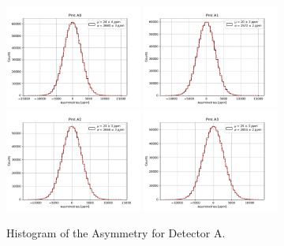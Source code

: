 \begin{figure}[!h]
\centering
\includegraphics[width = 0.40\textwidth]{Analysis/Histogram/A0.pdf} 
\includegraphics[width = 0.40\textwidth]{Analysis/Histogram/A1.pdf}\\
\includegraphics[width = 0.40\textwidth]{Analysis/Histogram/A2.pdf} 
\includegraphics[width = 0.40\textwidth]{Analysis/Histogram/A3.pdf}
\caption{Histogram of the Asymmetry for Detector A.}
\end{figure}

